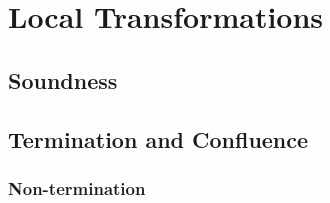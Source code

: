 \chapter{Local Transformations}

\section{Soundness}

\section{Termination and Confluence}
\subsection{Non-termination}